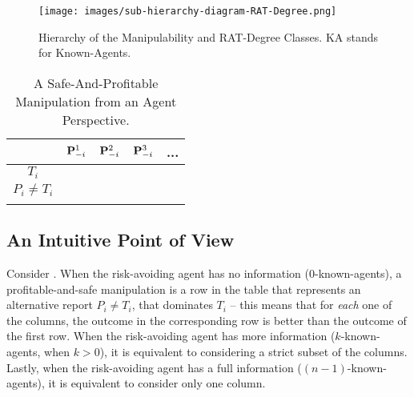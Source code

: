 
\begin{figure}[t]
    \centering
    \texttt{[image: images/sub-hierarchy-diagram-RAT-Degree.png]}
    \caption{Hierarchy of the Manipulability and RAT-Degree Classes. KA stands for Known-Agents.}
    \label{fig:hierarchy-RAT-Degree}
\end{figure}



\begin{wraptable}{r}{5cm}
    \centering
    \begin{tabular}{c|c|c|c|c}
         & $\mathbf{P}_{-i}^1$ & $\mathbf{P}_{-i}^2$ & $\mathbf{P}_{-i}^3$ &... \\
         \hline
         $T_i$ & & &\\
         \hline
         $P_i \neq T_i$ & & &\\
    \label{tab:safe-manip-i}
    \end{tabular}
    \caption{A Safe-And-Profitable Manipulation from an Agent Perspective.}
\end{wraptable}
\subsection{An Intuitive Point of View}
Consider . 
When the risk-avoiding agent has no information ($0$-known-agents), a profitable-and-safe manipulation is a row in the table that represents an alternative report $P_i \neq T_i$, that dominates $T_i$ -- this means that for \emph{each} one of the columns, the outcome in the corresponding row is better than the outcome of the first row.
When the risk-avoiding agent has more information ($k$-known-agents, when $k >0$), it is equivalent to considering a strict subset of the columns.
Lastly, when the risk-avoiding agent has a full information ($(n-1)$-known-agents), it is equivalent to consider only one column.


